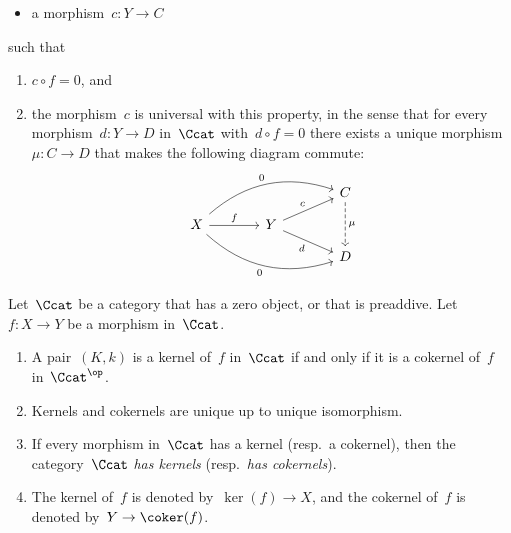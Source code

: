 \begin{definition}
\begin{enumerate}
\begin{itemize}
          \item
            a morphism~$c \colon Y \to C$
        \end{itemize}
        such that
        \begin{enumerate}[label=(C\arabic*)]
          \item
            $c \circ f = 0$, and
          \item
            the morphism~$c$ is universal with this property, in the sense that
            for every morphism~$d \colon Y \to D$ in~$\Ccat$ with~$d \circ f = 0$ there exists a unique morphism~$\mu \colon C \to D$ that makes the following diagram commute:
            \[
              \begin{tikzcd}[row sep = small, column sep = large]
                  {}
                & {}
                & C
                  \arrow[dashed]{dd}[right]{\mu}
                \\
                  X
                  \arrow{r}[above]{f}
                  \arrow[bend left]{urr}[above left]{0}
                  \arrow[bend right]{drr}[below left]{0}
                & Y
                  \arrow{ur}[above left]{c}
                  \arrow{dr}[below left]{d}
                & {}
                \\
                  {}
                & {}
                & D
              \end{tikzcd}
            \]
        \end{enumerate}
  \end{enumerate}
\end{definition}


\begin{remark}
  Let~$\Ccat$ be a category that has a zero object, or that is preaddive.
  Let~$f \colon X \to Y$ be a morphism in~$\Ccat$.
  \begin{enumerate}
    \item
      A pair~$(K,k)$ is a kernel of~$f$ in~$\Ccat$ if and only if it is a cokernel of~$f$ in~$\Ccat^\op$.
    \item
      Kernels and cokernels are unique up to unique isomorphism.
    \item
      If every morphism in~$\Ccat$ has a kernel (resp.\ a cokernel), then the category~$\Ccat$ \emph{has kernels} (resp.\ \emph{has cokernels}).
    \item
      The kernel of~$f$ is denoted by~$\ker(f) \to X$, and the cokernel of~$f$ is denoted by~$Y \to \coker(f)$.
  \end{enumerate}
\end{remark}


